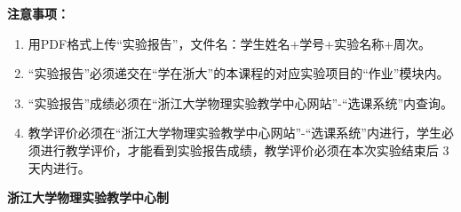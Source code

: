 \documentclass[10pt,a4paper]{ctexart}
\newcommand{\sihao}{\fontsize{14pt}{18pt}\selectfont}
\newcommand{\xiaosi}{\fontsize{12pt}{16pt}\selectfont}
\begin{document}
\sihao\textbf{注意事项：}
\xiaosi
\begin{enumerate}
    \item 用PDF格式上传“实验报告”，文件名：学生姓名+学号+实验名称+周次。
    \item  “实验报告”必须递交在“学在浙大”的本课程的对应实验项目的“作业”模块内。
    \item  “实验报告”成绩必须在“浙江大学物理实验教学中心网站”-“选课系统”内查询。
    \item 教学评价必须在“浙江大学物理实验教学中心网站”-“选课系统”内进行，学生必须进行教学评价，才能看到实验报告成绩，教学评价必须在本次实验结束后 3 天内进行。
\end{enumerate}

\vspace{1cm}
\xiaosi\centering \textbf{浙江大学物理实验教学中心制}
\end{document}
